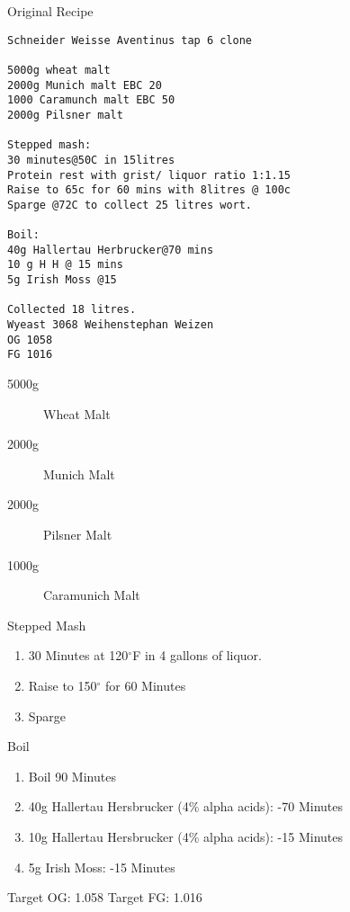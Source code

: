 \def\todaysdate{20190706}
\newday{\todaysdate}\label{\todaysdate}


Original Recipe

\begin{verbatim}
Schneider Weisse Aventinus tap 6 clone

5000g wheat malt
2000g Munich malt EBC 20
1000 Caramunch malt EBC 50
2000g Pilsner malt

Stepped mash:
30 minutes@50C in 15litres
Protein rest with grist/ liquor ratio 1:1.15
Raise to 65c for 60 mins with 8litres @ 100c
Sparge @72C to collect 25 litres wort.

Boil:
40g Hallertau Herbrucker@70 mins
10 g H H @ 15 mins
5g Irish Moss @15

Collected 18 litres.
Wyeast 3068 Weihenstephan Weizen
OG 1058
FG 1016
\end{verbatim}

\begin{description}
    \item[5000g] Wheat Malt
    \item[2000g] Munich Malt
    \item[2000g] Pilsner Malt
    \item[1000g] Caramunich Malt
\end{description}

Stepped Mash
\begin{enumerate}
  \item 30 Minutes at 120$^{\circ}$F in 4 gallons of liquor.
  \item Raise to 150$^{\circ}$ for 60 Minutes
  \item Sparge
\end{enumerate}

Boil
\begin{enumerate}
    \item Boil 90 Minutes
    \item 40g Hallertau Hersbrucker (4\% alpha acids): -70 Minutes
    \item 10g Hallertau Hersbrucker (4\% alpha acids): -15 Minutes
    \item 5g Irish Moss: -15 Minutes
\end{enumerate}

Target OG: 1.058
Target FG: 1.016

\def\todaysdate{20190707}
\newday{\todaysdate}\label{\todaysdate}

